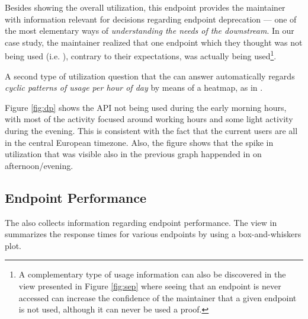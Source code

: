 \documentclass{sig-alternate-05-2015}
\begin{document}
Besides showing the overall utilization, this endpoint provides the maintainer with information relevant for decisions regarding endpoint deprecation --- one of the most elementary ways of {\em understanding the needs of the downstream}\cite{Haen14a}. In our case study, the maintainer realized that one endpoint which they thought was not being used (i.e. ), contrary to their expectations, was actually being used\footnote{A complementary type of usage information can also be discovered in the view presented in Figure \ref{fig:sep} where seeing that an endpoint is never accessed can increase the confidence of the maintainer that a given endpoint is not used, although it can never be used a proof.}.

\niceseparator


A second type of utilization question that the \tool can answer automatically regards {\em cyclic patterns of usage per hour of day} by means of a heatmap, as in . 




Figure \ref{fig:dp} shows the API not being used during the early morning hours, with most of the activity focused around working hours and some light activity during the evening. This is consistent with the fact that the current users are all in the central European timezone. Also, the figure shows that the spike in utilization that was visible also in the previous graph happended in on afternoon/evening.

\subsection{Endpoint Performance}
\label{sec:perf}

  The \tool also collects information regarding endpoint performance. The view in  summarizes the response times for various endpoints by using a box-and-whiskers plot. 
\end{document}
